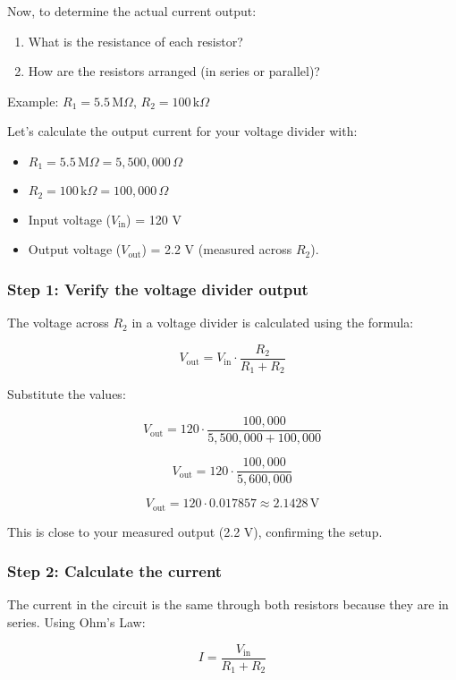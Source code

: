 \documentclass{article}
\begin{document}
	Now, to determine the actual current output:
	\begin{enumerate}
		\item What is the resistance of each resistor?
		\item How are the resistors arranged (in series or parallel)?
	\end{enumerate}
	
	Example:
	\( R_1 = 5.5 \, \text{M}\Omega \), \( R_2 = 100 \, \text{k}\Omega \)
	
	Let's calculate the output current for your voltage divider with:
	\begin{itemize}
		\item \( R_1 = 5.5 \, \text{M}\Omega = 5,500,000 \, \Omega \)
		\item \( R_2 = 100 \, \text{k}\Omega = 100,000 \, \Omega \)
		\item Input voltage (\( V_{\text{in}} \)) = 120 V
		\item Output voltage (\( V_{\text{out}} \)) = 2.2 V (measured across \( R_2 \)).
	\end{itemize}
	
	\subsubsection*{Step 1: Verify the voltage divider output}
	
	The voltage across \( R_2 \) in a voltage divider is calculated using the formula:
	
	\[
	V_{\text{out}} = V_{\text{in}} \cdot \frac{R_2}{R_1 + R_2}
	\]
	
	Substitute the values:
	
	\[
	V_{\text{out}} = 120 \cdot \frac{100,000}{5,500,000 + 100,000} 
	\]
	
	\[
	V_{\text{out}} = 120 \cdot \frac{100,000}{5,600,000} 
	\]
	
	\[
	V_{\text{out}} = 120 \cdot 0.017857 \approx 2.1428 \, \text{V}
	\]
	
	This is close to your measured output (2.2 V), confirming the setup.
	
	\subsubsection*{Step 2: Calculate the current}
	
	The current in the circuit is the same through both resistors because they are in series. Using Ohm's Law:
	
	\[
	I = \frac{V_{\text{in}}}{R_1 + R_2}
	\]
	
\end{document}

